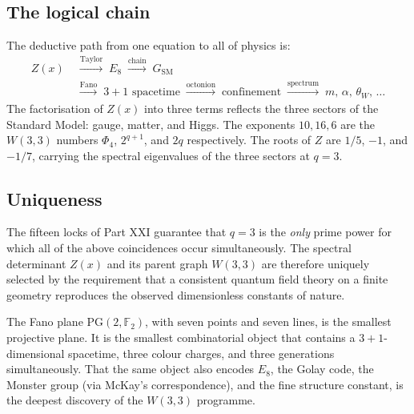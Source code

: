 \subsection{The logical chain}

The deductive path from one equation to all of physics is:
\begin{equation}
  \label{eq:logical_chain}
  \begin{aligned}
  Z(x)
  &\;\xrightarrow{\text{Taylor}}\; E_8
   \;\xrightarrow{\text{chain}}\; G_{\mathrm{SM}}\\
  &\;\xrightarrow{\text{Fano}}\; 3{+}1\text{ spacetime}
   \;\xrightarrow{\text{octonion}}\; \text{confinement}
   \;\xrightarrow{\text{spectrum}}\; m,\,\alpha,\,\theta_W,\,\ldots
  \end{aligned}
\end{equation}
The factorisation of $Z(x)$ into three terms reflects the three sectors
of the Standard Model: gauge, matter, and Higgs.  The exponents $10, 16, 6$
are the $W(3,3)$ numbers $\Phi_4$, $2^{q+1}$, and $2q$ respectively.
The roots of $Z$ are $1/5$, $-1$, and $-1/7$, carrying the spectral
eigenvalues of the three sectors at $q=3$.

\subsection{Uniqueness}

The fifteen locks of Part XXI guarantee that $q=3$ is the \emph{only}
prime power for which all of the above coincidences occur simultaneously.
The spectral determinant $Z(x)$ and its parent graph $W(3,3)$ are
therefore uniquely selected by the requirement that a consistent quantum
field theory on a finite geometry reproduces the observed dimensionless
constants of nature.

\begin{remark}
The Fano plane $\mathrm{PG}(2,\mathbb{F}_2)$, with seven points and seven
lines, is the smallest projective plane.  It is the smallest combinatorial
object that contains a $3+1$-dimensional spacetime, three colour charges,
and three generations simultaneously.  That the same object also encodes
$E_8$, the Golay code, the Monster group (via McKay's correspondence), and
the fine structure constant, is the deepest discovery of the $W(3,3)$
programme.
\end{remark}
